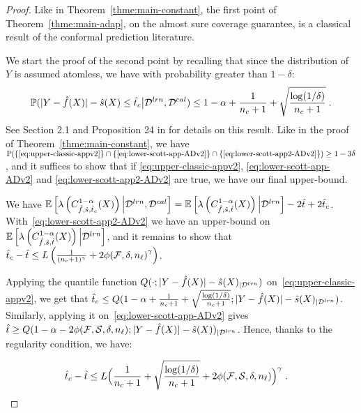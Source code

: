 \begin{proof}
    Like in Theorem~\ref{thme:main-constant}, the first point of Theorem~\ref{thme:main-adap}, on the almost sure coverage guarantee, is a classical result of the conformal prediction literature.
    
    

    We start the proof of the second point by recalling that since the distribution of $Y$ is assumed atomless, we have with probability greater than $1-\delta$:
    \begin{equation}
        \label{eq:upper-classic-appv2}
        {\mathbb{P}}( |Y-\hat{f}(X)| -\hat{s}(X) \leq \hat{t}_c \big|{\cal D}^{lrn},{\cal D}^{cal})\leq 1-\alpha + \frac{1}{n_c+1} +\sqrt{\frac{\log(1/\delta)}{n_c+1}}\;.
    \end{equation}
    See Section 2.1 and Proposition 24 in \citet{humbert2024marginal} for details on this result.
    Like in the proof of Theorem~\ref{thme:main-constant}, we have ${\mathbb{P}}(\{\eqref{eq:upper-classic-appv2}\}\cap\{\eqref{eq:lower-scott-app-ADv2}\}\cap\{\eqref{eq:lower-scott-app2-ADv2}\})\geq 1-3\delta$, and it suffices to show that if \eqref{eq:upper-classic-appv2}, \eqref{eq:lower-scott-app-ADv2} and \eqref{eq:lower-scott-app2-ADv2} are true, we have our final upper-bound.

    We have $\mathbb{E}\left[\lambda\left(C_{\hat{f},\hat{s},\hat{t}_c}^{1-\alpha}(X)\right)\Big|{\cal D}^{lrn},{\cal D}^{cal}\right] = \mathbb{E}\left[\lambda\left(C_{\hat{f},\hat{s},\hat{t}}^{1-\alpha}(X)\right)\Big|{\cal D}^{lrn}\right] - 2\hat{t} + 2\hat{t}_c$. With~\eqref{eq:lower-scott-app2-ADv2} we have an upper-bound on $\mathbb{E}\left[\lambda\left(C_{\hat{f},\hat{s},\hat{t}}^{1-\alpha}(X)\right)\Big|{\cal D}^{lrn}\right]$, and it remains to show that $\hat{t}_c - \hat{t} \leq L\left(\frac{1}{(n_{c}+1)^\gamma} + 2{\phi(\mathcal{F},\delta,n_\ell)}^\gamma\right)$.



Applying the quantile function $Q(\cdot; |Y-\hat{f}(X)|-\hat{s}(X)_{|{\cal D}^{lrn}})$ on~\eqref{eq:upper-classic-appv2}, we get that $\hat{t}_c \leq Q(1-\alpha + \frac{1}{n_c+1}+\sqrt{\frac{\log(1/\delta)}{n_c+1}}; |Y-\hat{f}(X)|-\hat{s}(X)_{|{\cal D}^{lrn}})$. Similarly, applying it on~\eqref{eq:lower-scott-app-ADv2} gives $\hat{t}\geq Q(1-\alpha - 2{\phi(\mathcal{F},{\cal S},\delta,n_\ell)}; |Y-\hat{f}(X)| - \hat{s}(X))_{|{\cal D}^{lrn}}$. Hence, thanks to the regularity condition, we have: %

    \begin{align*}
        \hat{t}_c - \hat{t} & \leq L\Big(\frac{1}{n_c+1}+\sqrt{\frac{\log(1/\delta)}{n_c+1}} + 2{\phi(\mathcal{F},{\cal S},\delta,n_\ell)}\Big)^\gamma \; .
    \end{align*}
    

\end{proof}
